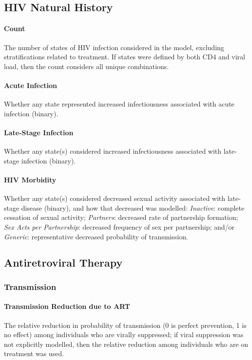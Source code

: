\subsection{HIV Natural History}
\label{aa:defs:hiv}
\paragraph{Count}
The number of states of HIV infection considered in the model,
excluding stratifications related to treatment.
If states were defined by both CD4 and viral load,
then the count considers all unique combinations.
\paragraph{Acute Infection}
Whether any state represented increased infectiousness associated with acute infection (binary).
\paragraph{Late-Stage Infection}
Whether any state(s) considered increased infectiousness associated with late-stage infection (binary).
\paragraph{HIV Morbidity}
Whether any state(s) considered decreased sexual activity associated with late-stage disease (binary),
and how that decreased was modelled:
\emph{Inactive}: complete cessation of sexual activity;
\emph{Partners}: decreased rate of partnership formation;
\emph{Sex Acts per Partnership}: decreased frequency of sex per partnership; and/or
\emph{Generic}: representative decreased probability of transmission.
\subsection{Antiretroviral Therapy}
\label{aa:defs:art}
\subsubsection{Transmission}
\label{aaa:defs:trans}
\paragraph{Transmission Reduction due to ART}
The relative reduction in probability of transmission
(0 is perfect prevention, 1 is no effect)
among individuals who are virally suppressed;
if viral suppression was not explicitly modelled,
then the relative reduction among individuals who are on treatment was used.
